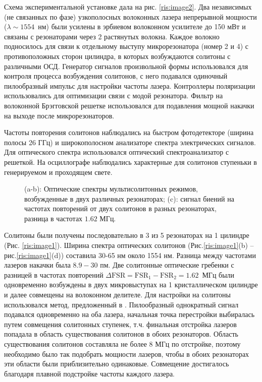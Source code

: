 Схема экспериментальной установке дала на рис. \ref{ris:image2}.  Два независимых (не связанных по фазе) узкополосных волоконных лазера непрерывной мощности ($\lambda \sim 1554$~нм) были усилены в эрбиевом волоконном усилителе до 150 мВт и связаны с резонаторами через 2 растянутых волокна. Каждое волокно подносилось для связи к отдельному выступу микрорезонатора (номер 2 и 4) с противоположных сторон цилиндра, в которых возбуждаются солитоны с различными ОСД. Генератор сигналов произвольной формы использовался для контроля процесса возбуждения солитонов, с него подавался одиночный пилообразный импульс для настройки частоты лазера. Контроллеры поляризации использовались для оптимизации связи с модой резонатора. Фильтр на волоконной Брэгговской решетке использовался для подавления мощной накачки на выходе после микрорезонаторов.

Частоты повторения солитонов наблюдались на быстром фотодетекторе (ширина полосы 26 ГГц) и широкополосном анализаторе спектра электрических сигналов. Для  оптического спектра использовался оптический спектроанализатор с решеткой. На осциллографе наблюдались характерные для солитонов ступеньки в генерируемом и проходящем свете.

\begin{figure}[!htb]
\begin{minipage}{1\linewidth}
\end{minipage}
\caption{(a-b): Оптические спектры мультисолитонных режимов, возбужденные в двух различных резонаторах; (c): сигнал биений на частотах повторений от двух солитонов в разных резонаторах, разница в частотах $1.62$ МГц.}
\label{ris:image3}
\end{figure}

Солитоны были получены последовательно в 3 из 5 резонаторах на 1 цилиндре (Рис. \ref{ris:image1}). Ширина спектра оптических солитонов (Рис.\ref{ris:image1}(b) -- рис.\ref{ris:image1}(d)) составила 30-65 нм около 1554 нм. Разница между частотами лазеров накачки была $8.9-30$ пм. Две солитонные оптические гребенки с разницей в частотах повторений $\Delta\mbox{FSR} = \mbox{FSR}_1 - \mbox{FSR}_2 = 1.62$~МГц были одновременно возбуждены в двух микровыступах на 1 кристаллическом цилиндре и далее совмещены на волоконном делителе. Для настройки на солитоны использовался метод, предложенный в \cite{Herr2014}. Пилообразный однократный сигнал подавался одновременно на оба лазера, начальная точка перестройки выбиралась путем совмещения солитонных ступенек, т.ч. финальная отстройка лазеров попадала в область существования солитонов в обоих резонаторов. Область существования солитонов составляла не более 8 МГц по отстройке, поэтому необходимо было так подобрать мощности лазеров, чтобы в обоих резонаторах эти области были приблизительно одинаковые. Совмещение достигалось благодаря плавной подстройке частоты каждого лазера.

